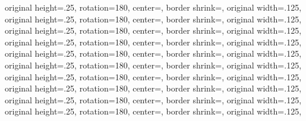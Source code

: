 {{	original height=.25\pgfpageoptionwidth,%
	rotation=180,%
	center=\pgfpoint{0.75\pgfphysicalwidth}{.375\pgfphysicalheight},%
	}%
  {%
	border shrink=\pgfpageoptionborder,%
	original width=.125\pgfpageoptionheight,%
	original height=.25\pgfpageoptionwidth,%
	rotation=180,%
	center=\pgfpoint{.5\pgfphysicalwidth}{.375\pgfphysicalheight},%
  }%
  {%
	border shrink=\pgfpageoptionborder,%
	original width=.125\pgfpageoptionheight,%
	original height=.25\pgfpageoptionwidth,%
	rotation=180,%
	center=\pgfpoint{.25\pgfphysicalwidth}{.375\pgfphysicalheight},%
  }%
  {%
	border shrink=\pgfpageoptionborder,%
	original width=.125\pgfpageoptionheight,%
	original height=.25\pgfpageoptionwidth,%
	rotation=180,%
	center=\pgfpoint{1\pgfphysicalwidth}{.25\pgfphysicalheight},%
  }%
  {%
	border shrink=\pgfpageoptionborder,%
	original width=.125\pgfpageoptionheight,%
	original height=.25\pgfpageoptionwidth,%
	rotation=180,%
	center=\pgfpoint{.75\pgfphysicalwidth}{.25\pgfphysicalheight},%
	}%
  {%
	border shrink=\pgfpageoptionborder,%
	original width=.125\pgfpageoptionheight,%
	original height=.25\pgfpageoptionwidth,%
	rotation=180,%
	center=\pgfpoint{.5\pgfphysicalwidth}{.25\pgfphysicalheight},%
  }%
  {%
	border shrink=\pgfpageoptionborder,%
	original width=.125\pgfpageoptionheight,%
	original height=.25\pgfpageoptionwidth,%
	rotation=180,%
	center=\pgfpoint{.25\pgfphysicalwidth}{.25\pgfphysicalheight},%
  }%
  {%
	border shrink=\pgfpageoptionborder,%
	original width=.125\pgfpageoptionheight,%
	original height=.25\pgfpageoptionwidth,%
	rotation=180,%
	center=\pgfpoint{1\pgfphysicalwidth}{.125\pgfphysicalheight},%
  }%
  {%
	border shrink=\pgfpageoptionborder,%
	original width=.125\pgfpageoptionheight,%
	original height=.25\pgfpageoptionwidth,%
	rotation=180,%
	center=\pgfpoint{0.75\pgfphysicalwidth}{.125\pgfphysicalheight},%
	}%
  {%
	border shrink=\pgfpageoptionborder,%
	original width=.125\pgfpageoptionheight,%
	original height=.25\pgfpageoptionwidth,%
	rotation=180,%
	center=\pgfpoint{.5\pgfphysicalwidth}{.125\pgfphysicalheight},%
  }%
  {%
	border shrink=\pgfpageoptionborder,%
	original width=.125\pgfpageoptionheight,%
}}
